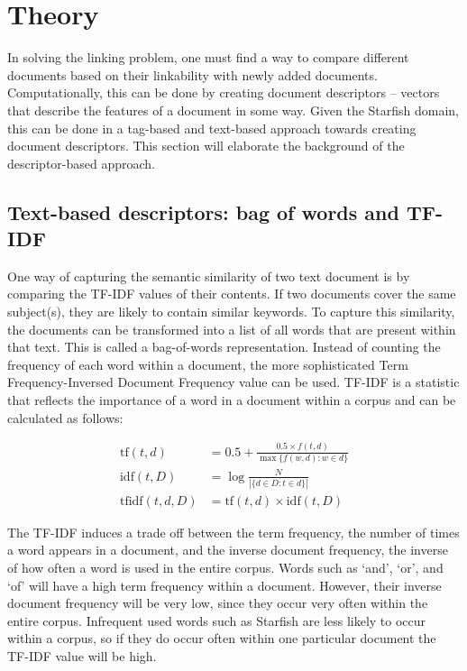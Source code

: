 \section{Theory}

In solving the linking problem, one must find a way to compare different
documents based on their linkability with newly added documents.
Computationally, this can be done by creating document descriptors -- vectors
that describe the features of a document in some way. Given the Starfish
domain, this can be done in a tag-based and text-based approach towards
creating document descriptors. This section will elaborate the background of
the descriptor-based approach. 

\subsection{Text-based descriptors: bag of words and TF-IDF}
One way of capturing the semantic similarity of two text document is by
comparing the TF-IDF values of their contents. If two documents cover the same
subject(s), they are likely to contain similar keywords. To capture this
similarity, the documents can be transformed into a list of all words that are
present within that text. This is called a bag-of-words representation. Instead
of counting the frequency of each word within a document, the more
sophisticated Term Frequency-Inversed Document Frequency value can be used.
TF-IDF is a statistic that reflects the importance of a word in a document
within a corpus and can be calculated as follows:

\begin{align}
  \textrm{tf}(t,d)      &= 0.5 + \frac{0.5 \times {f}(t, d)}{\max\{{f}(w, d):w \in d\}}\\
  \textrm{idf}(t, D)    &=  \log \frac{N}{|\{d \in D: t \in d\}|}\\
  \textrm{tfidf}(t,d,D) &= \textrm{tf}(t,d) \times \textrm{idf}(t, D)
\end{align}

The TF-IDF induces a trade off between the term frequency, the number of times
a word appears in a document, and the inverse document frequency, the inverse
of how often a word is used in the entire corpus. Words such as `and', `or',
and `of' will have a high term frequency within a document. However, their
inverse document frequency will be very low, since they occur very often within
the entire corpus. Infrequent used words such as Starfish are less likely to
occur within a corpus, so if they do occur often within one particular document
the TF-IDF value will be high. 

